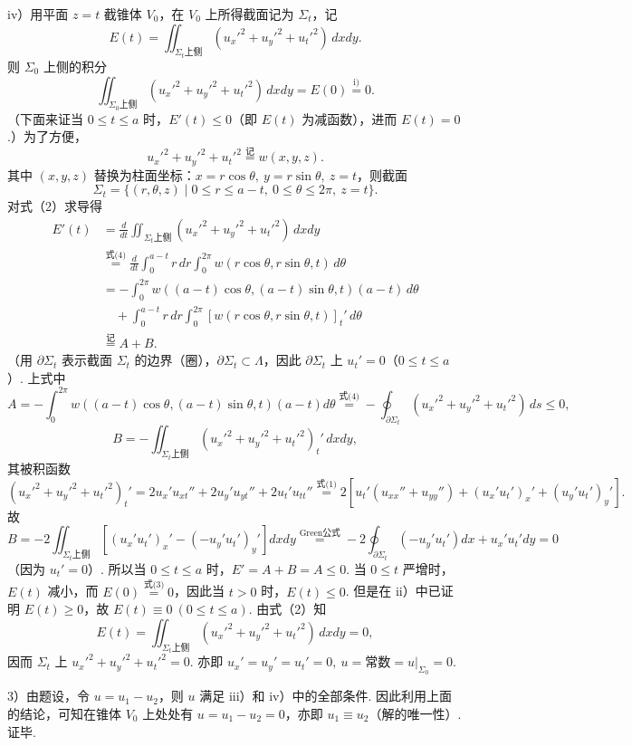 \documentclass[UTF8,12pt,a4paper,fontset=fandol]{ctexart}
\providecommand{\xlongequal}[1]{\overset{#1}{=}}
\begin{document}
iv）用平面 $z=t$ 截锥体 $V_0$，在 $V_0$ 上所得截面记为 $\Sigma_t$，记
\[
E(t)=\iint_{\Sigma_t\text{上侧}}(u_x'^2+u_y'^2+u_t'^2)\,dxdy. \tag{2}
\]
则 $\Sigma_0$ 上侧的积分
\[
\iint_{\Sigma_0\text{上侧}}(u_x'^2+u_y'^2+u_t'^2)\,dxdy=E(0)\xlongequal{\text{i)}}0. \tag{3}
\]
（下面来证当 $0\le t\le a$ 时，$E'(t)\le0$（即 $E(t)$ 为减函数），进而 $E(t)=0$.）为了方便，
\[
u_x'^2+u_y'^2+u_t'^2\overset{\text{记}}=w(x,y,z). \tag{4}
\]
其中 $(x,y,z)$ 替换为柱面坐标：$x=r\cos\theta,\ y=r\sin\theta,\ z=t$，则截面
\[
\Sigma_t=\{(r,\theta,z)\mid0\le r\le a-t,\ 0\le\theta\le2\pi,\ z=t\}.
\]
对式（2）求导得
\[
\begin{aligned}
E'(t)&=\frac d{dt}\iint_{\Sigma_t\text{上侧}}(u_x'^2+u_y'^2+u_t'^2)\,dxdy\\
&\xlongequal{\text{式(4)}}\frac d{dt}\int_0^{a-t}r\,dr\int_0^{2\pi}w(r\cos\theta,r\sin\theta,t)\,d\theta\\
&=-\int_0^{2\pi}w((a-t)\cos\theta,(a-t)\sin\theta,t)(a-t)\,d\theta\\
&\quad+\int_0^{a-t}r\,dr\int_0^{2\pi}[w(r\cos\theta,r\sin\theta,t)]_t'\,d\theta\\
&\overset{\text{记}}=A+B.
\end{aligned}
\]
（用 $\partial\Sigma_t$ 表示截面 $\Sigma_t$ 的边界（圈），$\partial\Sigma_t\subset\Lambda$，因此 $\partial\Sigma_t$ 上 $u_t'=0$（$0\le t\le a$）. 上式中
\[
A=-\int_0^{2\pi}w((a-t)\cos\theta,(a-t)\sin\theta,t)(a-t)d\theta
\xlongequal{\text{式(4)}}-\oint_{\partial\Sigma_t}(u_x'^2+u_y'^2+u_t'^2)\,ds\le0,
\]
\[
B=-\iint_{\Sigma_t\text{上侧}}(u_x'^2+u_y'^2+u_t'^2)_t'\,dxdy,
\]
其被积函数
\[
(u_x'^2+u_y'^2+u_t'^2)_t'
=2u_x'u_{xt}''+2u_y'u_{yt}''+2u_t'u_{tt}''
\xlongequal{\text{式(1)}}2[u_t'(u_{xx}''+u_{yy}'')+(u_x'u_t')_x'+(u_y'u_t')_y'].
\]
故
\[
B=-2\iint_{\Sigma_t\text{上侧}}\left[(u_x'u_t')_x'-(-u_y'u_t')_y'\right]dxdy
\xlongequal{\text{Green公式}}-2\oint_{\partial\Sigma_t}(-u_y'u_t')dx+u_x'u_t'dy=0
\]
（因为 $u_t'=0$）. 所以当 $0\le t\le a$ 时，$E'=A+B=A\le0$. 当 $0\le t$ 严增时，$E(t)$ 减小，而 $E(0)\xlongequal{\text{式(3)}}0$，因此当 $t>0$ 时，$E(t)\le0$. 但是在 ii）中已证明 $E(t)\ge0$，故 $E(t)\equiv0\ (0\le t\le a)$. 由式（2）知
\[
E(t)=\iint_{\Sigma_t\text{上侧}}(u_x'^2+u_y'^2+u_t'^2)\,dxdy=0,
\]
因而 $\Sigma_t$ 上 $u_x'^2+u_y'^2+u_t'^2=0$. 亦即 $u_x'=u_y'=u_t'=0,\ u=\text{常数}=u|_{\Sigma_0}=0$.

3）由题设，令 $u=u_1-u_2$，则 $u$ 满足 iii）和 iv）中的全部条件. 因此利用上面的结论，可知在锥体 $V_0$ 上处处有 $u=u_1-u_2=0$，亦即 $u_1\equiv u_2$（解的唯一性）. 证毕.
\end{document}
